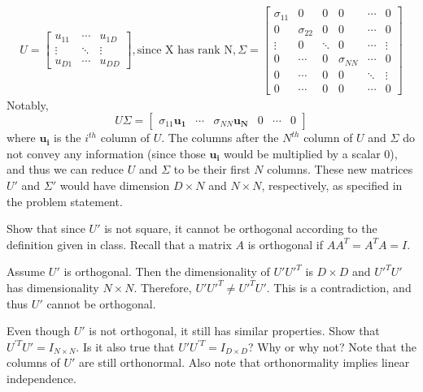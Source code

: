 \begin{solution}
	\begin{align*}
		U = 
		\begin{bmatrix}
			u_{11} & \cdots & u_{1D} \\
			\vdots & \ddots & \vdots \\
			u_{D1} & \cdots & u_{DD}
		\end{bmatrix}, \text{since X has rank N},
		\Sigma = 
		\begin{bmatrix}
			\sigma_{11} & 0 & 0 & 0 & \cdots & 0 \\
			0 & \sigma_{22} & 0 & 0 & \cdots & 0 \\
			\vdots & 0 & \ddots & 0 & \cdots & \vdots \\
			0 & \cdots & 0 & \sigma_{NN} & \cdots & 0\\
			0 & \cdots & 0 & 0 & \ddots & \vdots \\
			0 & \cdots & 0 & 0 & \cdots & 0
		\end{bmatrix}
	\end{align*}
	Notably, $$
		U\Sigma = 
		\begin{bmatrix}
			\sigma_{11}\mathbf{u_{1}} & \cdots & \sigma_{NN}\mathbf{u_{N}} & 0 & \cdots & 0
		\end{bmatrix}
	$$ where $\mathbf{u_{i}}$ is the $i^{th}$ column of $U$. The columns after the $N^{th}$ column of $U$ and $\Sigma$ do not convey any information (since those $\mathbf{u_{i}}$ would be multiplied by a scalar $0$), and thus we can reduce $U$ and $\Sigma$ to be their first $N$ columns. These new matrices $U'$ and $\Sigma'$ would have dimension $D \times N$ and $N \times N$, respectively, as specified in the problem statement.
\end{solution}

\problem[3] Show that since $U'$ is not square, it cannot be orthogonal according to the definition given in class. Recall that a matrix $A$ is orthogonal if $A A^T = A^T A = I$.

\begin{solution}
	Assume $U'$ is orthogonal. Then the dimensionality of $U'U'^T$ is $D \times D$ and $U'^TU'$ has dimensionality $N \times N$. Therefore, $U'U'^T \neq U'^TU'$. This is a contradiction, and thus $U'$ cannot be orthogonal.
\end{solution}

\problem[4] Even though $U'$ is not orthogonal, it still has similar properties. Show that $U^{'T} U' = I_{N \times N}$. Is it also true that $U' U^{'T} = I_{D \times D}$? Why or why not? Note that the columns of $U'$ are still orthonormal. Also note that orthonormality implies linear independence.

